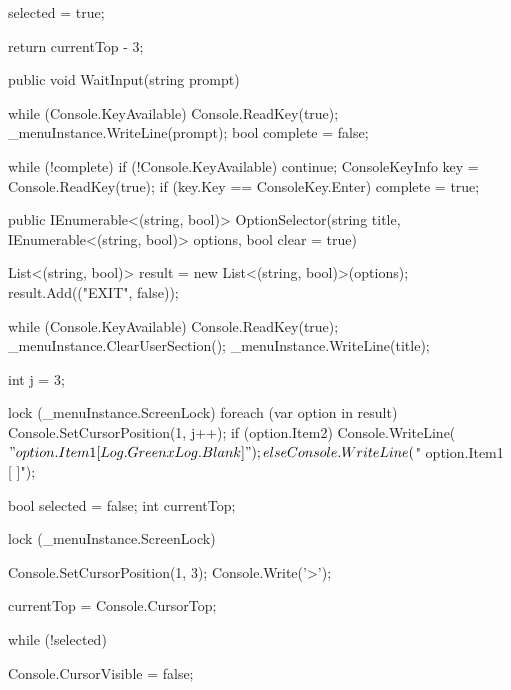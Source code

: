 \begin{flushleft}
\begin{cscode}
{{{{                selected = true;
            }
        }

        return currentTop - 3;
    }

    public void WaitInput(string prompt)
    {
        while (Console.KeyAvailable) Console.ReadKey(true);
        _menuInstance.WriteLine(prompt);
        bool complete = false;

        while (!complete)
        {
            if (!Console.KeyAvailable) continue;
            ConsoleKeyInfo key = Console.ReadKey(true);
            if (key.Key == ConsoleKey.Enter) complete = true;
        }
    }

    public IEnumerable<(string, bool)> OptionSelector(string title, IEnumerable<(string, bool)> options, bool clear = true)
    {
        List<(string, bool)> result = new List<(string, bool)>(options);
        result.Add(("EXIT", false));

        while (Console.KeyAvailable) Console.ReadKey(true);
        _menuInstance.ClearUserSection();
        _menuInstance.WriteLine(title);

        int j = 3;

        lock (_menuInstance.ScreenLock)
        {
            foreach (var option in result)
            {
                Console.SetCursorPosition(1, j++);
                if (option.Item2) Console.WriteLine($"  {option.Item1} [{Log.Green}x{Log.Blank}]");
                else Console.WriteLine($"  {option.Item1} [ ]");
            }
        }

        bool selected = false;
        int currentTop;

        lock (_menuInstance.ScreenLock)
        {
            Console.SetCursorPosition(1, 3);
            Console.Write('>');

            currentTop = Console.CursorTop;
        }

        while (!selected)
        {
            Console.CursorVisible = false;

}}}
\end{cscode}
\end{flushleft}
